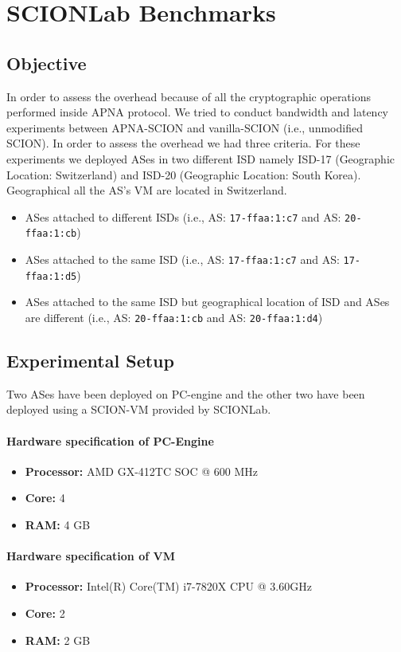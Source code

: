 \section{SCIONLab Benchmarks} \label{perf:scionlab}
\subsection{Objective}
In order to assess the overhead because of all the cryptographic operations performed inside APNA protocol. We tried to conduct bandwidth and latency experiments between APNA-SCION and vanilla-SCION (i.e., unmodified SCION). In order to assess the overhead we had three criteria. For these experiments we deployed ASes in two different ISD namely ISD-17 (Geographic Location: Switzerland) and ISD-20 (Geographic Location: South Korea). Geographical all the AS's VM are located in Switzerland.
\begin{itemize}
    \item ASes attached to different ISDs (i.e., AS: \texttt{17-ffaa:1:c7} and AS: \texttt{20-ffaa:1:cb})
    \item ASes attached to the same ISD (i.e., AS: \texttt{17-ffaa:1:c7} and AS: \texttt{17-ffaa:1:d5})
    \item ASes attached to the same ISD but geographical location of ISD and ASes are different (i.e., AS: \texttt{20-ffaa:1:cb} and AS: \texttt{20-ffaa:1:d4})
\end{itemize}

\subsection{Experimental Setup}
Two ASes have been deployed on PC-engine and the other two have been deployed using a SCION-VM provided by SCIONLab.

\paragraph{Hardware specification of PC-Engine}
\begin{itemize}
    \item \textbf{Processor:} AMD GX-412TC SOC @ 600 MHz
    \item \textbf{Core:} 4
    \item \textbf{RAM:} 4 GB
\end{itemize}

\paragraph{Hardware specification of VM}
\begin{itemize}
    \item \textbf{Processor:} Intel(R) Core(TM) i7-7820X CPU @ 3.60GHz
    \item \textbf{Core:} 2
    \item \textbf{RAM:} 2 GB
\end{itemize}

